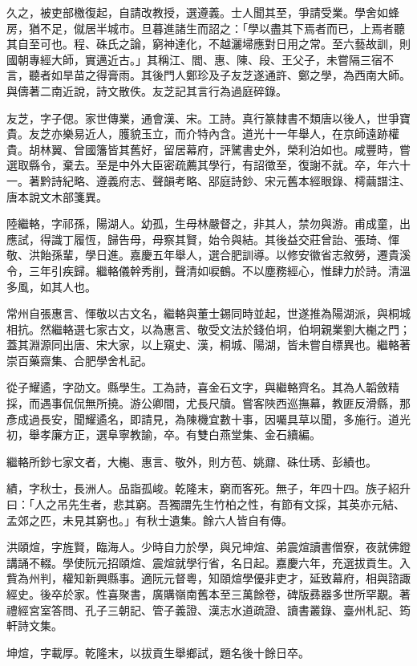 \begin{pinyinscope}
久之，被吏部檄復起，自請改教授，選遵義。士人聞其至，爭請受業。學舍如蜂房，猶不足，僦居半城市。旦暮進諸生而詔之：「學以盡其下焉者而已，上焉者聽其自至可也。程、硃氏之論，窮神達化，不越灑埽應對日用之常。至六藝故訓，則國朝專經大師，實邁近古。」其稱江、閻、惠、陳、段、王父子，未嘗隔三宿不言，聽者如旱苗之得膏雨。其後門人鄭珍及子友芝遂通許、鄭之學，為西南大師。與儔著二南近說，詩文散佚。友芝記其言行為過庭碎錄。

友芝，字子偲。家世傳業，通會漢、宋。工詩。真行篆隸書不類唐以後人，世爭寶貴。友芝亦樂易近人，臒貌玉立，而介特內含。道光十一年舉人，在京師遠跡權貴。胡林翼、曾國籓皆其舊好，留居幕府，評騭書史外，榮利泊如也。咸豐時，嘗選取縣令，棄去。至是中外大臣密疏薦其學行，有詔徵至，復謝不就。卒，年六十一。著黔詩紀略、遵義府志、聲韻考略、郘庭詩鈔、宋元舊本經眼錄、樗繭譜注、唐本說文木部箋異。

陸繼輅，字祁孫，陽湖人。幼孤，生母林嚴督之，非其人，禁勿與游。甫成童，出應試，得識丁履恆，歸告母，母察其賢，始令與結。其後益交莊曾詒、張琦、惲敬、洪飴孫輩，學日進。嘉慶五年舉人，選合肥訓導。以修安徽省志敘勞，遷貴溪令，三年引疾歸。繼輅儀幹秀削，聲清如唳鶴。不以塵務經心，惟肆力於詩。清溫多風，如其人也。

常州自張惠言、惲敬以古文名，繼輅與董士錫同時並起，世遂推為陽湖派，與桐城相抗。然繼輅選七家古文，以為惠言、敬受文法於錢伯坰，伯坰親業劉大櫆之門；蓋其淵源同出唐、宋大家，以上窺史、漢，桐城、陽湖，皆未嘗自標異也。繼輅著崇百藥齋集、合肥學舍札記。

從子耀遹，字劭文。縣學生。工為詩，喜金石文字，與繼輅齊名。其為人韜斂精採，而遇事侃侃無所撓。游公卿間，尤長尺牘。嘗客陜西巡撫幕，教匪反滑縣，那彥成過長安，聞耀遹名，即請見，為陳機宜數十事，因囑具草以聞，多施行。道光初，舉孝廉方正，選阜寧教諭，卒。有雙白燕堂集、金石續編。

繼輅所鈔七家文者，大櫆、惠言、敬外，則方苞、姚鼐、硃仕琇、彭績也。

績，字秋士，長洲人。品詣孤峻。乾隆末，窮而客死。無子，年四十四。族子紹升曰：「人之吊先生者，悲其窮。吾獨謂先生竹柏之性，有節有文採，其英亦元結、孟郊之匹，未見其窮也。」有秋士遺集。餘六人皆自有傳。

洪頤煊，字旌賢，臨海人。少時自力於學，與兄坤煊、弟震煊讀書僧寮，夜就佛鐙講誦不輟。學使阮元招頤煊、震煊就學行省，名日起。嘉慶六年，充選拔貢生。入貲為州判，權知新興縣事。適阮元督粵，知頤煊學優非吏才，延致幕府，相與諮諏經史。後卒於家。性喜聚書，廣購嶺南舊本至三萬餘卷，碑版彞器多世所罕覯。著禮經宮室答問、孔子三朝記、管子義證、漢志水道疏證、讀書叢錄、臺州札記、筠軒詩文集。

坤煊，字載厚。乾隆末，以拔貢生舉鄉試，題名後十餘日卒。


\end{pinyinscope}
